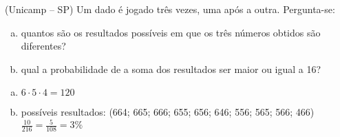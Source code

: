 \begin{ex}
 (Unicamp – SP) Um dado é jogado três vezes, uma após a outra. Pergunta-se:
   \begin{enumerate}[(a)]
   \item quantos são os resultados possíveis em que os três números obtidos são diferentes?
   \item qual a probabilidade de a soma dos resultados ser maior ou igual a 16?
   \end{enumerate}
     \begin{sol}
       \phantom{A}
       \begin{enumerate} [(a)]
           \item $6\cdot5\cdot4=120$
           \item possíveis resultados: (664; 665; 666; 655; 656; 646; 556; 565; 566; 466) \\
           $\frac{10}{216}=\frac{5}{108}=3\%$
       \end{enumerate}
     \end{sol}
\end{ex}